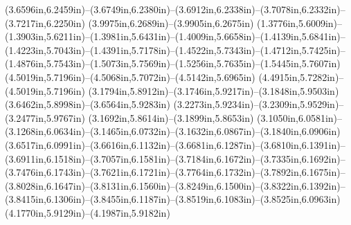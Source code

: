 (3.6596in,6.2459in)--(3.6749in,6.2380in)--(3.6912in,6.2338in)--(3.7078in,6.2332in)--(3.7217in,6.2250in) (3.9975in,6.2689in)--(3.9905in,6.2675in) (1.3776in,5.6009in)--(1.3903in,5.6211in)--(1.3981in,5.6431in)--(1.4009in,5.6658in)--(1.4139in,5.6841in)--(1.4223in,5.7043in)--(1.4391in,5.7178in)--(1.4522in,5.7343in)--(1.4712in,5.7425in)--(1.4876in,5.7543in)--(1.5073in,5.7569in)--(1.5256in,5.7635in)--(1.5445in,5.7607in) (4.5019in,5.7196in)--(4.5068in,5.7072in)--(4.5142in,5.6965in) (4.4915in,5.7282in)--(4.5019in,5.7196in) (3.1794in,5.8912in)--(3.1746in,5.9217in)--(3.1848in,5.9503in) (3.6462in,5.8998in)--(3.6564in,5.9283in) (3.2273in,5.9234in)--(3.2309in,5.9529in)--(3.2477in,5.9767in) (3.1692in,5.8614in)--(3.1899in,5.8653in) (3.1050in,6.0581in)--(3.1268in,6.0634in)--(3.1465in,6.0732in)--(3.1632in,6.0867in)--(3.1840in,6.0906in) (3.6517in,6.0991in)--(3.6616in,6.1132in)--(3.6681in,6.1287in)--(3.6810in,6.1391in)--(3.6911in,6.1518in)--(3.7057in,6.1581in)--(3.7184in,6.1672in)--(3.7335in,6.1692in)--(3.7476in,6.1743in)--(3.7621in,6.1721in)--(3.7764in,6.1732in)--(3.7892in,6.1675in)--(3.8028in,6.1647in)--(3.8131in,6.1560in)--(3.8249in,6.1500in)--(3.8322in,6.1392in)--(3.8415in,6.1306in)--(3.8455in,6.1187in)--(3.8519in,6.1083in)--(3.8525in,6.0963in) (4.1770in,5.9129in)--(4.1987in,5.9182in)
